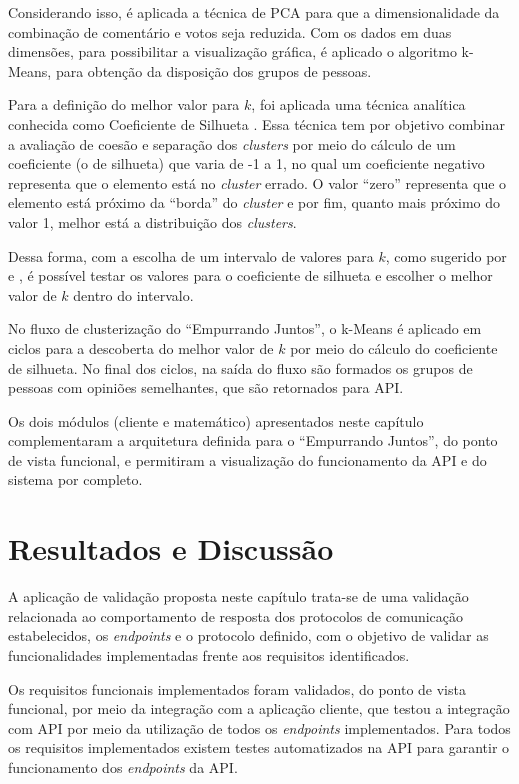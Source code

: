     Considerando isso, é aplicada a técnica de PCA para que
    a dimensionalidade da combinação de comentário e votos seja reduzida. 
    Com os dados em duas dimensões, para possibilitar a visualização gráfica, 
    é aplicado o algoritmo k-Means, para obtenção da disposição dos grupos de pessoas. 
    
    Para a definição do melhor valor para $k$, foi aplicada uma técnica analítica conhecida como Coeficiente de Silhueta \cite{tan2013data}.  
    Essa técnica tem por objetivo combinar a avaliação de coesão e separação dos \textit{clusters} por meio do cálculo de um coeficiente (o de silhueta) que 
    varia de -1 a 1, no qual um coeficiente negativo representa que o elemento está no \textit{cluster} errado.
    O valor ``zero'' representa que o elemento está próximo da ``borda'' do \textit{cluster} e por fim, quanto mais próximo do valor 1, melhor
    está a distribuição dos \textit{clusters}.

    Dessa forma, com a escolha de um intervalo de valores para $k$, como sugerido por  e , é possível testar os valores 
    para o coeficiente de silhueta e escolher o melhor valor de $k$ dentro do intervalo. 

    No fluxo de clusterização do ``Empurrando Juntos'', o k-Means é aplicado em ciclos para a descoberta do melhor valor de 
    $k$ por meio do cálculo do coeficiente de silhueta.
    No final dos ciclos, na saída do fluxo são formados os grupos de pessoas com opiniões semelhantes, que são retornados para API.
 
    Os dois módulos (cliente e matemático) apresentados neste capítulo complementaram a arquitetura definida para o ``Empurrando Juntos'',
    do ponto de vista funcional, e permitiram a visualização do funcionamento da API e do sistema por completo.
    
    \section{Resultados e Discussão}
    
    A aplicação de validação proposta neste capítulo trata-se de uma validação relacionada ao comportamento de resposta
    dos protocolos de comunicação estabelecidos, os \textit{endpoints}
    e o protocolo definido, com o objetivo de validar as funcionalidades implementadas frente aos requisitos identificados.
    
    Os requisitos funcionais implementados foram validados, do ponto de vista funcional, por meio da integração com a aplicação cliente,
    que testou a integração com API por meio da utilização de todos os \textit{endpoints} implementados.
    Para todos os requisitos implementados existem testes automatizados na API para garantir o funcionamento dos \textit{endpoints} da API.
        
